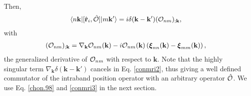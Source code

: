 \documentclass[aps,letterpaper]{revtex4}
\begin{document}
Then,
\begin{align}\label{conmri3}
\langle n\mathbf{k} |[\hat{\mathbf{r}}_{i},\hat{{\cal O}}]| m\mathbf{k}' \rangle
=i\delta(\mathbf{k}-\mathbf{k}')({\cal O}_{nm})_{;\mathbf{k}}
,
\end{align}   
with
\begin{align}\label{gendev}
({\cal O}_{nm})_{;\mathbf{k}}=
\nabla_{\mathbf{k}}
{\cal O}_{n m}(\mathbf{k})
-  
i
{\cal O}_{nm}(\mathbf{k})
\left(
\boldsymbol{\xi}_{nn}(\mathbf{k})
-
\boldsymbol{\xi}_{mm}(\mathbf{k})
\right)
,
\end{align}  
the generalized derivative of ${\cal O}_{nm}$ with respect to $\mathbf{k}$.
Note that the highly singular term $\nabla_{\mathbf{k}}\delta(\mathbf{k}-\mathbf{k}')$
cancels in Eq. \eqref{conmri2}, thus giving a well defined commutator
of the intraband position operator with an arbitrary operator $\hat{{\cal O}}$.
We use Eq. \eqref{chon.98} and \eqref{conmri3}  in the next section.



\end{document}
